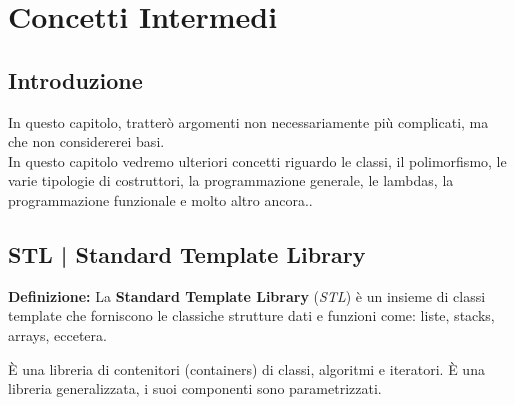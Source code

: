 
\chapter{Concetti Intermedi}






\section{Introduzione}

\textsf{\small In questo capitolo, tratterò argomenti non necessariamente più complicati, ma che non considererei basi. } \\

\textsf{\small In questo capitolo vedremo ulteriori concetti riguardo le classi, il polimorfismo, le varie tipologie di costruttori, la programmazione generale, le lambdas, la programmazione funzionale e molto altro ancora..} \break



\section{STL | Standard Template Library}

\textsf{\small \textbf{Definizione: } La \textbf{Standard Template Library} (\emph{STL}) è un insieme di classi template che forniscono le classiche strutture dati e funzioni come: liste, stacks, arrays, eccetera.} \break

\textsf{\small È una libreria di contenitori (containers) di classi, algoritmi e iteratori. È una libreria generalizzata, i suoi componenti sono parametrizzati.} \\

